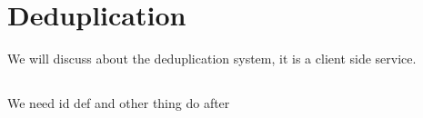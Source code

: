 \section{Deduplication}
We will discuss about the deduplication system, it is a client side service.

\subsection{}
We need id def and other thing do after
